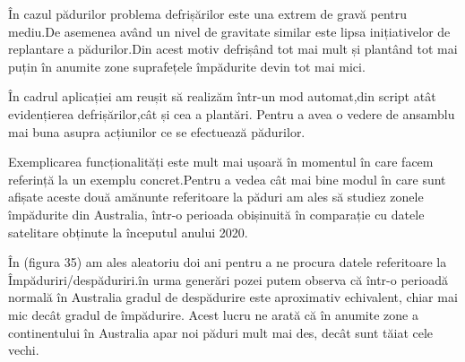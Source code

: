 \documentclass[12pt,a4paper]{article}
\theoremstyle{definition}
\theoremstyle{remark}
\begin{document}
În cazul pădurilor problema defrișărilor este una extrem de gravă pentru mediu.De asemenea având un nivel de gravitate similar este lipsa inițiativelor de replantare a pădurilor.Din acest motiv defrișând tot mai mult și plantând tot mai puțin în anumite zone suprafețele împădurite devin tot mai mici. 

În cadrul aplicației am reușit să realizăm într-un mod automat,din script atât evidențierea defrișărilor,cât și cea a plantări. Pentru a avea o vedere de ansamblu mai buna asupra acțiunilor ce se efectuează pădurilor.\newline

Exemplicarea funcționalități este mult mai ușoară în momentul în care facem referință la un exemplu concret.Pentru a vedea cât mai bine modul în care sunt afișate aceste două amănunte referitoare la păduri am ales să studiez zonele împădurite din Australia, într-o perioada obișinuită  în comparație cu datele satelitare obținute la începutul anului 2020.

În (figura 35) am ales aleatoriu doi ani pentru a ne procura datele referitoare la Împăduriri/despăduriri.în urma generări pozei putem observa că într-o perioadă normală în Australia gradul de despădurire este aproximativ echivalent, chiar mai mic decât gradul de împădurire. Acest lucru ne arată că în anumite zone a continentului în Australia apar noi păduri mult mai des, decât sunt tăiat cele vechi.
\end{document}
